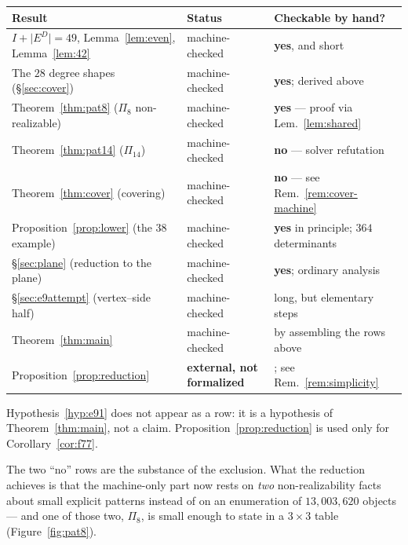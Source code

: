 \documentclass[11pt,a4paper]{article}
\theoremstyle{plain}
\theoremstyle{definition}
\theoremstyle{remark}
\newcommand{\ED}{E^{D}}
\begin{document}
\begin{center}
\small
\begin{tabular}{@{}>{\raggedright\arraybackslash}p{}>{\raggedright\arraybackslash}p{}>{\raggedright\arraybackslash}p{}@{}}
\toprule
\textbf{Result} & \textbf{Status} & \textbf{Checkable by hand?} \\
\midrule
$I+\lvert \ED\rvert=49$, Lemma~\ref{lem:even}, Lemma~\ref{lem:42}
  & machine-checked & \textbf{yes}, and short \\
The $28$ degree shapes (\S\ref{sec:cover})
  & machine-checked & \textbf{yes}; derived above \\
Theorem~\ref{thm:pat8} ($\Pi_8$ non-realizable)
  & machine-checked & \textbf{yes} --- proof via Lem.~\ref{lem:shared} \\
Theorem~\ref{thm:pat14} ($\Pi_{14}$)
  & machine-checked & \textbf{no} --- solver refutation \\
Theorem~\ref{thm:cover} (covering)
  & machine-checked & \textbf{no} --- see Rem.~\ref{rem:cover-machine} \\
Proposition~\ref{prop:lower} (the $38$ example)
  & machine-checked & \textbf{yes} in principle; $364$ determinants \\
\S\ref{sec:plane} (reduction to the plane)
  & machine-checked & \textbf{yes}; ordinary analysis \\
\S\ref{sec:e9attempt} (vertex--side half)
  & machine-checked & long, but elementary steps \\
Theorem~\ref{thm:main}
  & machine-checked & by assembling the rows above \\
Proposition~\ref{prop:reduction}
  & \textbf{external, not formalized} & \cite[\S9.1]{AckermanKeszeghRote2022};
    see Rem.~\ref{rem:simplicity} \\
\bottomrule
\end{tabular}
\end{center}

\noindent Hypothesis~\ref{hyp:e91} does not appear as a row: it is a hypothesis
of Theorem~\ref{thm:main}, not a claim. Proposition~\ref{prop:reduction} is
used only for Corollary~\ref{cor:f77}.

The two ``no'' rows are the substance of the exclusion. What the reduction
achieves is that the machine-only part now rests
on \emph{two} non-realizability facts about small explicit patterns instead of
on an enumeration of $13{,}003{,}620$ objects --- and one of those two,
$\Pi_8$, is small enough to state in a $3\times3$ table
(Figure~\ref{fig:pat8}).
\end{document}
